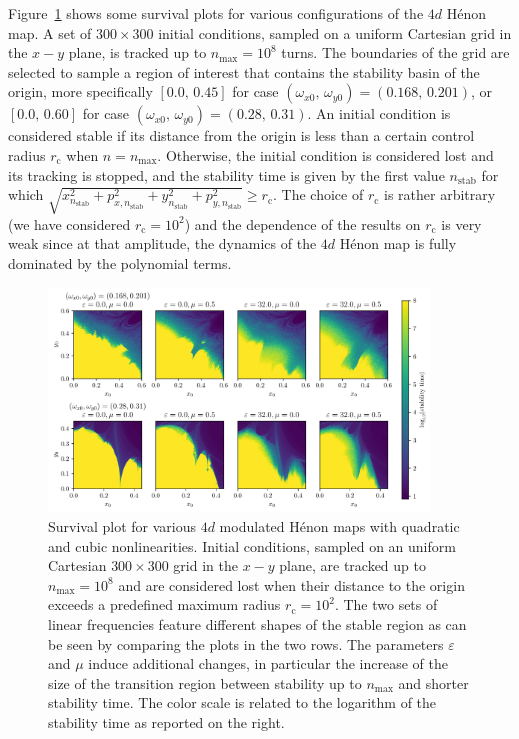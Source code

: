 Figure~\ref{fig:survival} shows some survival plots for various configurations of the $4d$ Hénon map. A set of $300\times300$ initial conditions, sampled on a uniform Cartesian grid in the $x-y$ plane, is tracked up to $n_\mathrm{max}=10^8$ turns. The boundaries of the grid are selected to sample a region of interest that contains the stability basin of the origin, more specifically $[0.0,\,0.45]$ for case $(\omega_{x0},\,\omega_{y0}) = (0.168,\,0.201)$, or $[0.0,\,0.60]$ for case $(\omega_{x0},\,\omega_{y0}) = (0.28,\,0.31)$. An initial condition is considered stable if its distance from the origin is less than a certain control radius $r_\mathrm{c}$ when $n=n_\mathrm{max}$. Otherwise, the initial condition is considered lost and its tracking is stopped, and the stability time is given by the first value $n_\mathrm{stab}$ for which $\sqrt{x^2_{n_\mathrm{stab}}+ p_{x,n_\mathrm{stab}}^2+y_{n_\mathrm{stab}}^2+p_{y,n_\mathrm{stab}}^2}\geq r_\mathrm{c}$. The choice of $r_\mathrm{c}$ is rather arbitrary (we have considered $r_\mathrm{c}=10^2$) and the dependence of the results on $r_\mathrm{c}$ is very weak since at that amplitude, the dynamics of the $4d$ Hénon map is fully dominated by the polynomial terms. 
%
\begin{figure}[htp]
    \centering
    \includegraphics[width=0.9\textwidth]{6_dynamic_indicators/figs/stability.pdf}
    \caption{Survival plot for various $4d$ modulated Hénon maps with quadratic and cubic nonlinearities. Initial conditions, sampled on an uniform Cartesian $300\times300$ grid in the $x-y$ plane, are tracked up to $n_\text{max}=10^8$ and are considered lost when their distance to the origin exceeds a predefined maximum radius $r_\mathrm{c}=10^2$. The two sets of linear frequencies feature different shapes of the stable region as can be seen by comparing the plots in the two rows. The parameters $\varepsilon$ and $\mu$ induce additional changes, in particular the increase of the size of the transition region between stability up to $n_\mathrm{max}$ and shorter stability time. The color scale is related to the logarithm of the stability time as reported on the right.}
    \label{fig:survival}
\end{figure}
